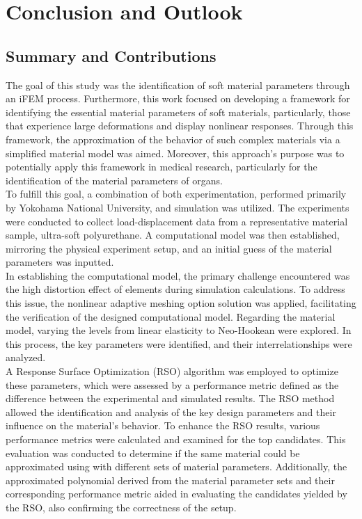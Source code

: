 
\chapter{Conclusion and Outlook} %

\label{Chapter7} %

\section{Summary and Contributions}
The goal of this study was the identification of soft material parameters through 
an iFEM process. Furthermore, this work focused on developing a framework for identifying the 
essential material parameters of soft materials, particularly, those that experience 
large deformations and display nonlinear responses. Through this framework, the 
approximation of the behavior of such complex materials via a simplified material model
was aimed. Moreover, this approach's purpose was to potentially apply this framework in medical research,
particularly for the identification of the material parameters of organs.\\

To fulfill this goal, a combination of both experimentation, performed primarily by Yokohama National University, 
and simulation was utilized. The experiments were conducted to collect load-displacement data from
a representative material sample, ultra-soft polyurethane. A computational model was then 
established, mirroring the physical experiment setup, and an initial guess of the material 
parameters was inputted.\\

In establishing the computational model, the primary challenge encountered was the 
high distortion effect of elements during simulation calculations. To address this issue, the nonlinear adaptive 
meshing option solution was applied, facilitating the verification of the designed 
computational model. Regarding the material model, varying the levels from linear elasticity to 
Neo-Hookean were explored. In this process, the key parameters were identified, and their interrelationships were analyzed.\\

A Response Surface Optimization (RSO) algorithm was employed to optimize these 
parameters, which were assessed by a performance metric defined as the difference between the 
experimental and simulated results. The RSO method allowed the identification and analysis of the 
key design parameters and their influence on the material's behavior. 
To enhance the RSO results, various performance metrics were calculated and examined for 
the top candidates. This evaluation was conducted to determine if the same material could be approximated 
using with different sets of material parameters. Additionally, the approximated polynomial derived 
from the material parameter sets and their corresponding performance metric aided in evaluating the 
candidates yielded by the RSO, also confirming the correctness of the setup.\\

